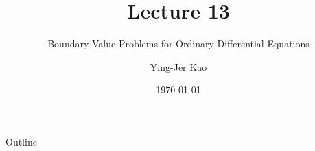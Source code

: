 \documentclass{beamer}
\title[Boundary-Value Problems for Ordinary
Differential Equations] %
{Lecture 13}
\subtitle
{Boundary-Value Problems for Ordinary
Differential Equations} %
\author[Ying-Jer Kao] %
{Ying-Jer Kao}
\institute[National Taiwan University] %
{
  Department of Physics\\
 National Taiwan University
  }
\date[Numerical Analysis and Programming] %
{\today}
\begin{document}
\begin{frame}
  \titlepage
\end{frame}

\begin{frame}{Outline}
  \tableofcontents
\end{frame}



\end{document}
